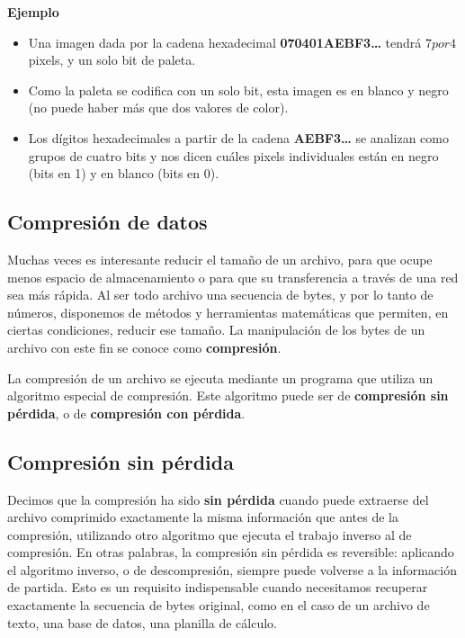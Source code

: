 \documentclass[spanish,A4,]{article}
\begin{document}
\textbf{Ejemplo}

\begin{itemize}
\itemsep1pt\parskip0pt
\item
  Una imagen dada por la cadena hexadecimal \textbf{070401AEBF3\ldots{}}
  tendrá $7  por  4$ pixels, y un solo bit de paleta.
\item
  Como la paleta se codifica con un solo bit, esta imagen es en blanco y
  negro (no puede haber más que dos valores de color).
\item
  Los dígitos hexadecimales a partir de la cadena \textbf{AEBF3\ldots{}}
  se analizan como grupos de cuatro bits y nos dicen cuáles pixels
  individuales están en negro (bits en 1) y en blanco (bits en 0).
\end{itemize}

\subsection{Compresión de datos}\label{compresiuxf3n-de-datos}

Muchas veces es interesante reducir el tamaño de un archivo, para que
ocupe menos espacio de almacenamiento o para que su transferencia a
través de una red sea más rápida. Al ser todo archivo una secuencia de
bytes, y por lo tanto de números, disponemos de métodos y herramientas
matemáticas que permiten, en ciertas condiciones, reducir ese tamaño. La
manipulación de los bytes de un archivo con este fin se conoce como
\textbf{compresión}.

La compresión de un archivo se ejecuta mediante un programa que utiliza
un algoritmo especial de compresión. Este algoritmo puede ser de
\textbf{compresión sin pérdida}, o de \textbf{compresión con pérdida}.

\subsection{Compresión sin pérdida}\label{compresiuxf3n-sin-puxe9rdida}

Decimos que la compresión ha sido \textbf{sin pérdida} cuando puede
extraerse del archivo comprimido exactamente la misma información que
antes de la compresión, utilizando otro algoritmo que ejecuta el trabajo
inverso al de compresión. En otras palabras, la compresión sin pérdida
es reversible: aplicando el algoritmo inverso, o de descompresión,
siempre puede volverse a la información de partida. Esto es un requisito
indispensable cuando necesitamos recuperar exactamente la secuencia de
bytes original, como en el caso de un archivo de texto, una base de
datos, una planilla de cálculo.
\end{document}
